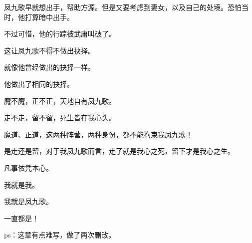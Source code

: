 \begin{this_body}
凤九歌早就想出手，帮助方源。但是又要考虑到妻女，以及自己的处境。恐怕当时，他打算暗中出手。

不过可惜，他的行踪被武庸叫破了。

这让凤九歌不得不做出抉择。

就像他曾经做出的抉择一样。

他做出了相同的抉择。

魔不魔，正不正，天地自有凤九歌。

走不走，留不留，死生皆在我心头。

魔道、正道，这两种阵营，两种身份，都不能拘束我凤九歌！

是走还是留，对于我凤九歌而言，走了就是我心之死，留下才是我心之生。

凡事依凭本心。

我就是我。

我就是凤九歌。

一直都是！

ps：这章有点难写，做了两次删改。

\end{this_body}

